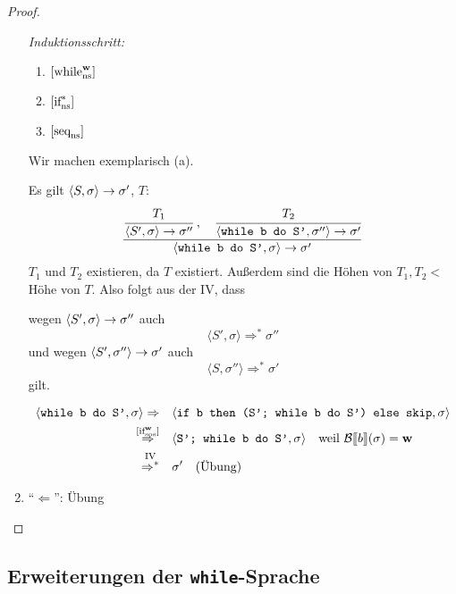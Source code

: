 \begin{proof}
\begin{enumerate}
            \par\bigskip
            \emph{Induktionsschritt:}
            \begin{enumerate}
                \item $\infruleNs[\true]{while}$
                \item $\infruleNs[*]{if}$
                \item $\infruleNs{seq}$
            \end{enumerate}

            Wir machen exemplarisch (a).

            Es gilt $\strans{S}{\sigma}{\sigma'}$, \dh{} $T$: \[
                \frac{
                    \cfrac{T_1}{\strans{S'}{\sigma}{\sigma''}}
                    \;,\quad
                    \cfrac{T_2}{\strans{\texttt{while b do S'}}{\sigma''}{\sigma'}}
                }{
                    \strans{\texttt{while b do S'}}{\sigma}{\sigma'}
                }
            \]
            $T_1$ und $T_2$ existieren, da $T$ existiert. Außerdem sind die Höhen von $T_1, T_2 < $ Höhe von $T$. Also folgt aus der IV, dass

            wegen $\strans{S'}{\sigma}{\sigma''}$ auch \[
                \langle S', \sigma \rangle \Rightarrow^* \sigma''
            \]
            und wegen $\strans{S'}{\sigma''}{\sigma'}$ auch \[
                \langle S, \sigma'' \rangle \Rightarrow^* \sigma'
            \]
            gilt.

            \begin{align*}
                \langle \texttt{while b do S'}, \sigma \rangle \Rightarrow & \quad \langle \texttt{if b then (S'; while b do S') else skip}, \sigma \rangle \\
                \overset{\infruleSos[\true]{if}}{\Rightarrow} & \quad \langle \texttt{S'; while b do S'}, \sigma \rangle \quad \text{weil } \Bsem{b}(\sigma) = \true \\
                \overset{\text{IV}}{\Rightarrow^*} & \quad \sigma' \quad \text{(Übung)}
            \end{align*}

        \item ``$\Leftarrow$'': Übung
    \end{enumerate}
\end{proof}



\subsection{Erweiterungen der \texttt{while}-Sprache}


